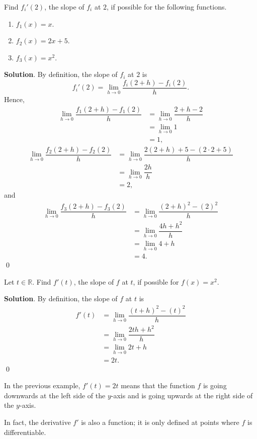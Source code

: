 \documentclass[11pt]{book}
\theoremstyle{break}
\theoremstyle{no_label}
\newcommand{\bbR}{\mathbb{R}}
\numberwithin{equation}{section}
\begin{document}
\begin{example}
    Find ${f_i}'(2)$, the slope of $f_i$ at $2$, if possible for the following functions.
    \begin{enumerate}
        \item $f_1(x)=x$.
        \item $f_2(x)=2x+5$.
        \item $f_3(x)=x^2$.
    \end{enumerate}
\end{example}
\textbf{Solution}. By definition, the slope of $f_i$ at $2$ is $${f_i}'(2)=\lim_{h\to 0}\dfrac{f_i(2+h)-f_i(2)}{h}.$$ Hence, \begin{align*}
    \lim_{h\to 0}\dfrac{f_1(2+h)-f_1(2)}{h}&=\lim_{h\to 0}\dfrac{2+h-2}{h}\\
    &=\lim_{h\to 0}1\\
    &=1,
\end{align*}
\begin{align*}
    \lim_{h\to 0}\dfrac{f_2(2+h)-f_2(2)}{h}&=\lim_{h\to 0}\dfrac{2(2+h)+5-(2\cdot2+5)}{h}\\
    &=\lim_{h\to 0}\dfrac{2h}{h}\\
    &=2,
\end{align*}
and \begin{align*}
    \lim_{h\to 0}\dfrac{f_3(2+h)-f_3(2)}{h}&=\lim_{h\to 0}\dfrac{(2+h)^2-(2)^2}{h}\\
    &=\lim_{h\to 0}\dfrac{4h+h^2}{h}\\
    &=\lim_{h\to 0}4+h\\
    &=4.
\end{align*} \qed

\begin{example}
    Let $t\in\bbR$. Find $f'(t)$, the slope of $f$ at $t$, if possible for $f(x)=x^2$.
\end{example}
\textbf{Solution}. By definition, the slope of $f$ at $t$ is \begin{align*}
    f'(t)&=\lim_{h\to 0}\dfrac{(t+h)^2-(t)^2}{h}\\
    &=\lim_{h\to 0}\dfrac{2th+h^2}{h}\\
    &=\lim_{h\to 0}2t+h\\
    &=2t.
\end{align*} \qed

In the previous example, $f'(t)=2t$ means that the function $f$ is going downwards at the left side of the $y$-axis and is going upwards at the right side of the $y$-axis.

In fact, the derivative $f'$ is also a function; it is only defined at points where $f$ is differentiable.
\end{document}
